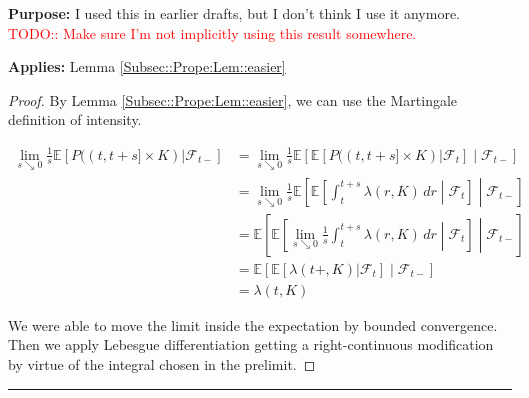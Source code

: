 \documentclass[12pt]{article}
\newcommand{\mb}{\mathbb}
\newcommand{\mc}{\mathcal}
\newcommand{\tr}{\textcolor{red}}
\newcommand{\purpose}{\textbf{Purpose: }}
\newcommand{\app}{\textbf{Applies: }}
\newcommand{\lin}{\rule{\linewidth}{0.4 pt}}
\newcommand{\ex}[1]{\mb{E}\left[#1\right]}			%
\renewcommand{\t}{t}							%
\renewcommand{\tt}{s}							%
\newcommand{\F}{\mc{F}}							%
\newcommand{\ts}[1]{_{#1}}						%
\newcommand{\rate}{\lambda}						%
\newcommand{\rp}{P}								%
\begin{document}
\purpose I used this in earlier drafts, but I don't think I use it anymore. \tr{TODO:: Make sure I'm not implicitly using this result somewhere.}

\app Lemma \ref{Subsec::Prope:Lem::easier}

\begin{proof}
By Lemma \ref{Subsec::Prope:Lem::easier}, we can use the Martingale definition of intensity.

\begin{align*}
\lim_{\tt\searrow 0}\frac{1}{\tt}\ex{\rp((\t,\t+\tt]\times K)|\F\ts{\t-}}& = \lim_{\tt\searrow 0}\frac{1}{\tt}\ex{\ex{\rp((\t,\t+\tt]\times K)|\F\ts{\t}}\middle|\F\ts{\t-}}\\
&= \lim_{\tt\searrow 0}\frac{1}{\tt}\ex{\ex{\int_{\t}^{\t+\tt} \rate(r,K)\,dr\middle|\F\ts{\t}}\middle|\F\ts{\t-}}\\
&= \ex{\ex{\lim_{\tt \searrow 0} \frac{1}{\tt}\int_{\t}^{\t+\tt} \rate(r,K)\,dr\middle|\F\ts{\t}}\middle|\F\ts{\t-}}\\
&=\ex{\ex{\rate(\t+,K)|\F\ts{\t}}\middle|\F\ts{\t-}}\\
&=\rate(\t,K)
\end{align*}

We were able to move the limit inside the expectation by bounded convergence. Then we apply Lebesgue differentiation getting a right-continuous modification by virtue of the integral chosen in the prelimit.
\end{proof}

\lin
\end{document}
